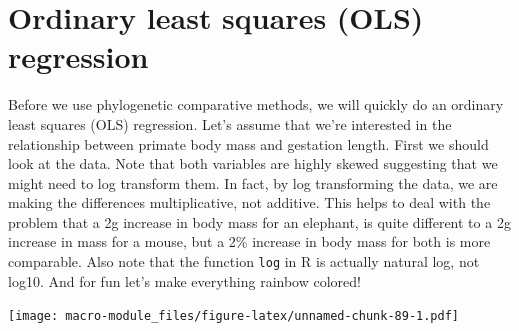 \documentclass[]{book}
\newenvironment{Shaded}{\begin{snugshade}}{\end{snugshade}}
\newcommand{\KeywordTok}[1]{\textcolor[rgb]{0.13,0.29,0.53}{\textbf{{#1}}}}
\newcommand{\DataTypeTok}[1]{\textcolor[rgb]{0.13,0.29,0.53}{{#1}}}
\newcommand{\DecValTok}[1]{\textcolor[rgb]{0.00,0.00,0.81}{{#1}}}
\newcommand{\StringTok}[1]{\textcolor[rgb]{0.31,0.60,0.02}{{#1}}}
\newcommand{\CommentTok}[1]{\textcolor[rgb]{0.56,0.35,0.01}{\textit{{#1}}}}
\newcommand{\NormalTok}[1]{{#1}}
\theoremstyle{definition}
\theoremstyle{definition}
\theoremstyle{definition}
\theoremstyle{remark}
\begin{document}
\section{Ordinary least squares (OLS)
regression}\label{ordinary-least-squares-ols-regression}

Before we use phylogenetic comparative methods, we will quickly do an
ordinary least squares (OLS) regression. Let's assume that we're
interested in the relationship between primate body mass and gestation
length. First we should look at the data. Note that both variables are
highly skewed suggesting that we might need to log transform them. In
fact, by log transforming the data, we are making the differences
multiplicative, not additive. This helps to deal with the problem that a
2g increase in body mass for an elephant, is quite different to a 2g
increase in mass for a mouse, but a 2\% increase in body mass for both
is more comparable. Also note that the function \texttt{log} in R is
actually natural log, not log10. And for fun let's make everything
rainbow colored!

\begin{Shaded}
\end{Shaded}

\texttt{[image: macro-module\_files/figure-latex/unnamed-chunk-89-1.pdf]}
\end{document}
